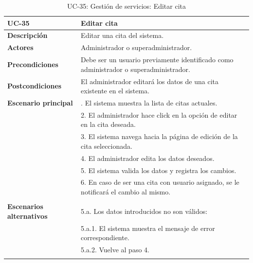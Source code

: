 \begin{table}[H]
  \begin{center}
    \begin{tabularx}{16.4cm}{|l|X|}
      \hline
      \textbf{UC-35} & \textbf{Editar cita}\\
      \hline
      \textbf{Descripción} & Editar una cita del sistema.\\
      \hline
      \textbf{Actores} & Administrador o superadministrador.\\
      \hline
      \textbf{Precondiciones} & Debe ser un usuario previamente identificado como administrador o superadministrador.\\
      \hline
      \textbf{Postcondiciones} & El administrador editará los datos de una cita existente en el sistema.\\
      \hline
      \textbf{Escenario principal} & \smallskip 1. El sistema muestra la lista de citas actuales.\\
      & 2. El administrador hace click en la opción de editar en la cita deseada.\\
      & 3. El sistema navega hacia la página de edición de la cita seleccionada.\\
      & 4. El administrador edita los datos deseados.\\
      & 5. El sistema valida los datos y registra los cambios.\\
      & 6. En caso de ser una cita con usuario asignado, se le notificará el cambio al mismo.\\
      & \\
      \hline
      \textbf{Escenarios alternativos} & \smallskip 5.a. Los datos introducidos no son válidos:\\
      & \hspace{0.3cm} 5.a.1. El sistema muestra el mensaje de error correspondiente.\\
      & \hspace{0.3cm} 5.a.2. Vuelve al paso 4.\\
      & \\
      \hline
    \end{tabularx}
    \caption{UC-35: Gestión de servicios: Editar cita}
    \label{tab:CU-editar-cita}
  \end{center}
\end{table}


